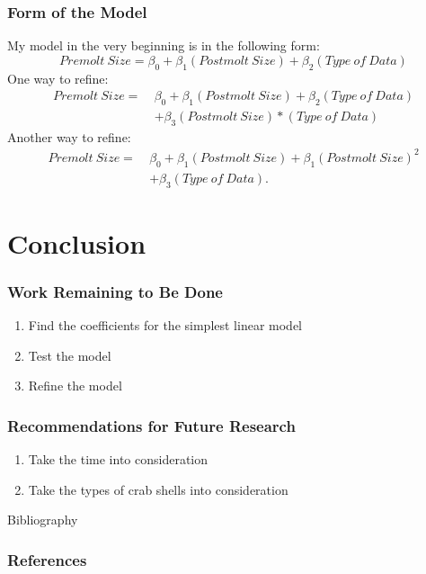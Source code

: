 \documentclass[compress,handout,10pt]{beamer}
\let\olditem\item
\renewcommand{\item}{\setlength{\itemsep}{0.5\baselineskip}\olditem}
\begin{document}
\begin{frame}
    \frametitle{Form of the Model}
     My model in the very beginning is in the following form:
     $$Premolt~Size=\beta_0 + \beta_1 (Postmolt~Size) + \beta_2 (Type~of~Data)$$
     One way to refine:
     \begin{align*}
      Premolt~Size = ~&\beta_0 + \beta_1 (Postmolt~Size) + \beta_2 (Type~of~Data)\\
               & + \beta_3 (Postmolt~Size)*(Type~of~Data)
     \end{align*}
     Another way to refine:
     \begin{align*}
      Premolt~Size = ~&\beta_0 + \beta_1 (Postmolt~Size) + \beta_1 (Postmolt~Size)^2\\
               & + \beta_3 (Type~of~Data).
     \end{align*}
\end{frame}

\section{Conclusion}
\begin{frame}
    \frametitle{Work Remaining to Be Done}
     \begin{enumerate}
         \item Find the coefficients for the simplest linear model
         \item Test the model
         \item Refine the model
     \end{enumerate}
\end{frame}

\begin{frame}
    \frametitle{Recommendations for Future Research}
     \begin{enumerate}
         \item Take the time into consideration
         \item Take the types of crab shells into consideration
     \end{enumerate}
\end{frame}

\begin{frame}{Bibliography}
    \frametitle{References}
        
        \nocite{*}
        
\end{frame}
\end{document}
